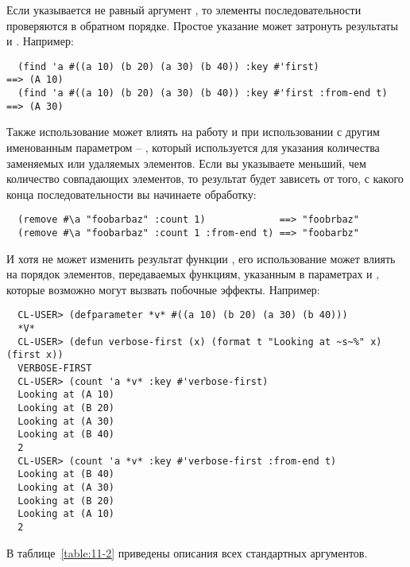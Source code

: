 Если указывается не равный  аргумент , то элементы
последовательности проверяются в обратном порядке.  Простое указание 
может затронуть результаты  и .  Например:

\begin{verbatim}
  (find 'a #((a 10) (b 20) (a 30) (b 40)) :key #'first)             ==> (A 10)
  (find 'a #((a 10) (b 20) (a 30) (b 40)) :key #'first :from-end t) ==> (A 30)
\end{verbatim}

Также использование  может влиять на работу  и
 при использовании с другим именованным параметром -- ,
который используется для указания количества заменяемых или удаляемых элементов.  Если вы
указываете  меньший, чем количество совпадающих элементов, то результат будет
зависеть от того, с какого конца последовательности вы начинаете обработку:

\begin{verbatim}
  (remove #\a "foobarbaz" :count 1)             ==> "foobrbaz"
  (remove #\a "foobarbaz" :count 1 :from-end t) ==> "foobarbz"
\end{verbatim}

И хотя  не может изменить результат функции , его
использование может влиять на порядок элементов, передаваемых функциям, указанным в
параметрах  и , которые возможно могут вызвать побочные эффекты.
Например:

\begin{verbatim}
  CL-USER> (defparameter *v* #((a 10) (b 20) (a 30) (b 40)))
  *V*
  CL-USER> (defun verbose-first (x) (format t "Looking at ~s~%" x) (first x))
  VERBOSE-FIRST
  CL-USER> (count 'a *v* :key #'verbose-first)
  Looking at (A 10)
  Looking at (B 20)
  Looking at (A 30)
  Looking at (B 40)
  2
  CL-USER> (count 'a *v* :key #'verbose-first :from-end t)
  Looking at (B 40)
  Looking at (A 30)
  Looking at (B 20)
  Looking at (A 10)
  2
\end{verbatim}

В таблице~\ref{table:11-2} приведены описания всех стандартных аргументов.

